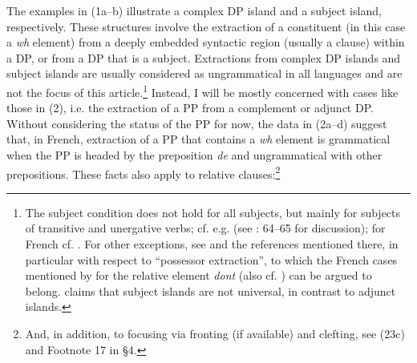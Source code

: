 \documentclass[output=paper]{langsci/langscibook}
\begin{document}
\ea%
    \label{ex:mensch:2}
    \z
\z

The examples in (1a–b) illustrate a complex DP island and a subject island, respectively. These structures involve the extraction of a constituent (in this case a \textit{wh} element) from a deeply embedded syntactic region (usually a clause) within a DP, or from a DP that is a subject. Extractions from complex DP islands and subject islands are usually considered as ungrammatical in all languages and are not the focus of this article.\footnote{The subject condition does not hold for all subjects, but mainly for subjects of transitive and unergative verbs; cf. e.g. \citet[153–154]{Chomsky2008} (see \citealt{Broekhuis2005}: 64–65 for discussion); for French cf. \citet[90]{Tellier1991}. For other exceptions, see \citet{Truswell2005} and the references mentioned there, in particular with respect to “possessor extraction”, to which the French cases mentioned by \citet{Tellier1990} for the relative element \textit{dont} (also cf. \citealt{Heck2008,Heck2009}) can be argued to belong. \citet{Stepanov2007} claims that subject islands are not universal, in contrast to adjunct islands.} Instead, I will be mostly concerned with cases like those in (2), i.e. the extraction of a PP from a complement or adjunct DP. Without considering the status of the PP for now, the data in (2a–d) suggest that, in French, extraction of a PP that contains a \textit{wh} element is grammatical when the PP is headed by the preposition \textit{de} and ungrammatical with other prepositions. These facts also apply to relative clauses:\footnote{And, in addition, to focusing via fronting (if available) and clefting, see (23c) and Footnote 17 in §4.}
\end{document}
